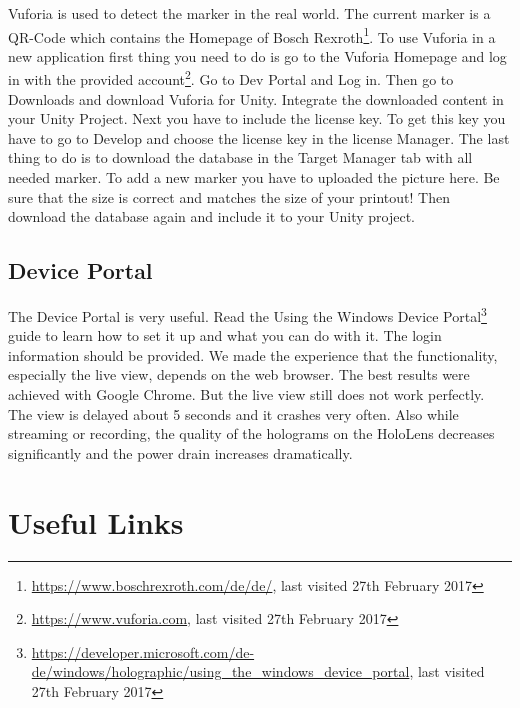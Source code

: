 Vuforia is used to detect the marker in the real world. The current marker is a QR-Code which contains the Homepage of Bosch Rexroth\footnote[4]{\url{https://www.boschrexroth.com/de/de/}, last visited 27th February 2017}.
To use Vuforia in a new application first thing you need to do is go to the Vuforia Homepage and log in with the provided account\footnote[5]{\url{https://www.vuforia.com}, last visited 27th February 2017}. Go to Dev Portal and Log in. Then go to Downloads and download Vuforia for Unity. Integrate the downloaded content in your Unity Project. Next you have to include the license key. To get this key you have to go to Develop and choose the license key in the license Manager. The last thing to do is to download the database in the Target Manager tab with all needed marker. To add a new marker you have to uploaded the picture here. Be sure that the size is correct and matches the size of your printout! Then download the database again and include it to your Unity project.

\section{Device Portal}

The Device Portal is very useful. Read the Using the Windows Device Portal\footnote[6]{\url{https://developer.microsoft.com/de-de/windows/holographic/using_the_windows_device_portal}, last visited 27th February 2017} guide to learn how to set it up and what you can do with it. The login information should be provided. We made the experience that the functionality, especially the live view, depends on the web browser. The best results were achieved with Google Chrome. But the live view still does not work perfectly. The view is delayed about 5 seconds and it crashes very often. Also while streaming or recording, the quality of the holograms on the HoloLens decreases significantly and the power drain increases dramatically.


\chapter{Useful Links}

